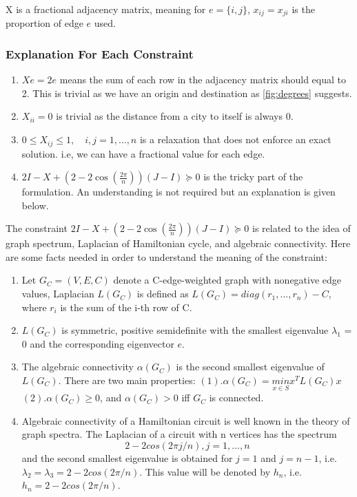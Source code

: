 \documentclass{article}
\begin{document}
\noindent X is a fractional adjacency matrix, meaning for $e = \{i, j\}$, $x_{ij} = x_{ji}$ is the proportion of edge $e$ used.
\subsubsection{Explanation For Each Constraint}
\begin{enumerate}
    \item $Xe = 2e$ means the sum of each row in the adjacency matrix should equal to 2. This is trivial as we have an origin and destination as \ref{fig:degrees} suggests. 
    \item $X_{ii} = 0$ is trivial as the distance from a city to itself is always 0.
    \item $0 \leq X_{ij} \leq 1, \quad i,j = 1,\ldots,n$ is a relaxation that does not enforce an exact solution. i.e, we can have a fractional value for each edge.
    \item $2I - X + (2-2\cos\left(\frac{2\pi}{n}\right))(J-I) \succeq 0$ is the tricky part of the formulation. An understanding is not required but an explanation is given below.
\end{enumerate}
The constraint $2I - X + (2-2\cos\left(\frac{2\pi}{n}\right))(J-I) \succeq 0$ is related to the idea of graph spectrum, Laplacian of Hamiltonian cycle, and algebraic connectivity. Here are some facts needed in order to understand the meaning of the constraint:
\begin{enumerate}
    \item Let $ G_C = (V, E, C)$ denote a C-edge-weighted graph with nonegative edge values, Laplacian $L(G_C)$ is defined as $L(G_C) = diag(r_1,...,r_n)-C$, where $r_i$ is the sum of the i-th row of C.
    \item $L(G_C)$ is symmetric, positive semidefinite with the smallest eigenvalue $\lambda_1$ = 0 and the corresponding eigenvector $e$.
    \item The algebraic connectivity $\alpha(G_C)$ is the second smallest eigenvalue of $L(G_C)$. There are two main properties: $(1).\alpha(G_C) = \underset{x \in S}{min}x^TL(G_C)x$ \quad $(2).\alpha(G_C) \geq 0$, and $\alpha(G_C) > 0$ iff $G_C$ is connected. 
    \item Algebraic connectivity of a Hamiltonian circuit is well known in the theory of graph spectra. The Laplacian of a circuit with n vertices has the spectrum $$2-2 cos(2\pi j/n), j = 1,...,n$$
    and the second smallest eigenvalue is obtained for $j = 1$ and $j = n-1$, i.e. $\lambda_2 = \lambda_3 = 2-2cos(2\pi/n)$. This value will be denoted by $h_n$, i.e. $h_n = 2-2cos(2\pi/n)$.
\end{enumerate}
\end{document}
